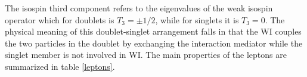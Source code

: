 \noindent The isospin third component refers to the eigenvalues of the weak isospin operator which for doublets is $T_3 = \pm 1/2$, while for singlets it is $T_3=0$. The physical meaning of this doublet-singlet arrangement falls in that the WI couples the two particles in the doublet by exchanging the interaction mediator while the singlet member is not involved in WI. The main properties of the leptons are summarized in table \ref{leptons}.\\






